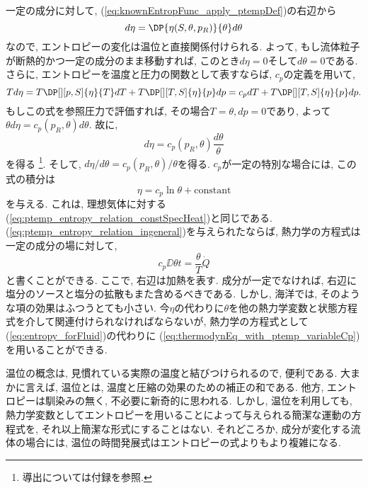 一定の成分に対して, (\ref{eq:knownEntropFunc_apply_ptempDef})の右辺から
\begin{equation}
  d\eta = \DP{\eta(S,\theta,p_R)}{\theta} d\theta
\end{equation}
なので, エントロピーの変化は温位と直接関係付けられる. 
よって, もし流体粒子が断熱的かつ一定の成分のまま移動すれば, 
このとき$d\eta=0$そして$d\theta =0$である. 
さらに, エントロピーを温度と圧力の関数として表すならば, 
$c_p$の定義を用いて, 
\begin{equation}
 Td\eta = T\DP[][p,S]{\eta}{T} dT + T\DP[][T,S]{\eta}{p} dp
  = c_p dT + T\DP[][T,S]{\eta}{p} dp. 
\end{equation}
もしこの式を参照圧力で評価すれば, その場合$T=\theta, dp=0$であり, 
よって$\theta d\eta = c_p(p_R,\theta) d\theta$. 
故に, 
\begin{equation}
  \boxed{
   d\eta = c_p(p_R,\theta) \dfrac{d\theta}{\theta}
   \label{eq:ptemp_entropy_relation_ingeneral}
  }
\end{equation}
を得る %
\footnote{
導出については付録を参照. 
}. 
そして, $d\eta/d\theta = c_p(p_R,\theta) /\theta$を得る. 
$c_p$が一定の特別な場合には, この式の積分は
\begin{equation}
 \eta = c_p \ln{\theta} + \text{constant}
\end{equation}
を与える. 
これは, 理想気体に対する(\ref{eq:ptemp_entropy_relation_constSpecHeat})と同じである. 
(\ref{eq:ptemp_entropy_relation_ingeneral})を与えられたならば, 
熱力学の方程式は一定の成分の場に対して, 
\begin{equation}
 c_p \DD{\theta}{t} = \dfrac{\theta}{T} \dot{Q}
 \label{eq:thermodynEq_with_ptemp_variableCp}
\end{equation}
と書くことができる. 
ここで, 右辺は加熱を表す. 
成分が一定でなければ, 右辺に塩分のソースと塩分の拡散もまた含めるべきである. 
しかし, 海洋では, そのような項の効果はふつうとても小さい. 
今$\eta$の代わりに$\theta$を他の熱力学変数と状態方程式を介して関連付けられなければならないが, 
熱力学の方程式として(\ref{eq:entropy_forFluid})の代わりに
(\ref{eq:thermodynEq_with_ptemp_variableCp})を用いることができる. 

温位の概念は, 見慣れている実際の温度と結びつけられるので, 便利である. 
大まかに言えば, 温位とは, 温度と圧縮の効果のための補正の和である. 
他方, エントロピーは馴染みの無く, 不必要に新奇的に思われる. 
しかし, 温位を利用しても, 
熱力学変数としてエントロピーを用いることによって与えられる簡潔な運動の方程式を, 
それ以上簡潔な形式にすることはない. 
それどころか, 成分が変化する流体の場合には, 温位の時間発展式はエントロピーの式よりもより複雑になる. 

